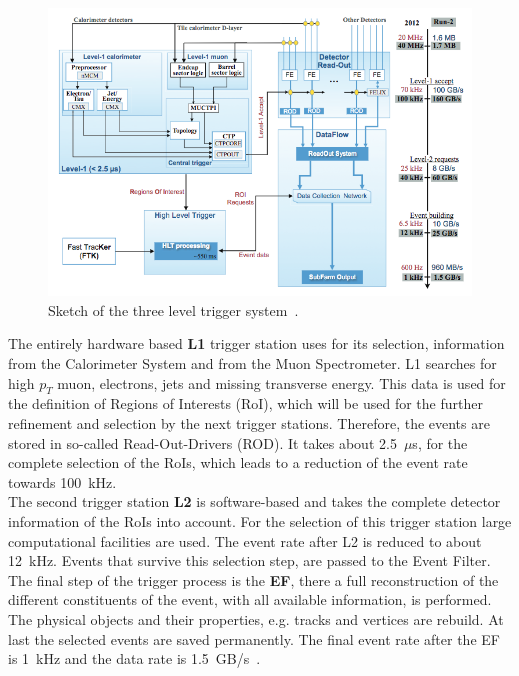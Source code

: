 \begin{figure}[t]
	\centering
	\includegraphics[width=1.0\linewidth]{trigger}
	\caption{Sketch of the three level trigger system~\cite{Nakahama:2015211}.} 
	\label{fig:38}
\end{figure}


\noindent The entirely hardware based \textbf{L1} trigger station uses for its selection, information from the Calorimeter System and from the Muon Spectrometer. L1 searches for high $p_T$ muon, electrons, jets and missing transverse energy. This data is used for the definition of Regions of Interests (RoI), which will be used for the further refinement and selection by the next trigger stations. Therefore, the events are stored in so-called Read-Out-Drivers (ROD). It takes about 2.5~$\mu$s, for the complete selection of the RoIs, which leads to a reduction of the event rate towards 100~kHz. \\

\noindent The second trigger station \textbf{L2} is software-based and takes the complete detector information of the RoIs into account. For the selection of this trigger station large computational facilities are used. The event rate after L2 is reduced to about 12~kHz. 
Events that survive this selection step, are passed to the Event Filter.\\

\noindent The final step of the trigger process is the \textbf{EF}, there a full reconstruction of the different constituents of the event, with all available information, is performed. The physical objects and their properties, e.g.  tracks and vertices are rebuild. At last the selected events are saved permanently. The final event rate after the EF is 1~kHz and the data rate is 1.5~GB/s~\cite{Nakahama:2015211}.






